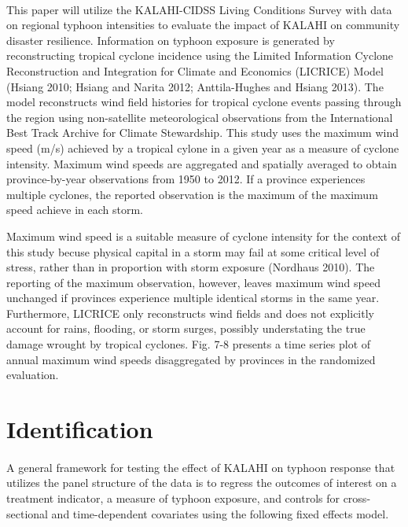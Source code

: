 \documentclass[12pt]{article}
\begin{document}
	\paragraph{ } This paper will utilize the KALAHI-CIDSS Living Conditions Survey with data on regional typhoon intensities to evaluate the impact of KALAHI on community disaster resilience. Information on typhoon exposure is generated by reconstructing tropical cyclone incidence using the Limited Information Cyclone Reconstruction and Integration for Climate and Economics (LICRICE) Model (Hsiang 2010; Hsiang and Narita 2012; Anttila-Hughes and Hsiang 2013). The model reconstructs wind field histories for tropical cyclone events passing through the region using non-satellite meteorological observations from the International Best Track Archive for Climate Stewardship. This study uses the maximum wind speed (m/s) achieved by a tropical cylone in a given year as a measure of cyclone intensity. Maximum wind speeds are aggregated and spatially averaged to obtain province-by-year observations from 1950 to 2012. If a province experiences multiple cyclones, the reported observation is the maximum of the maximum speed achieve in each storm. 

	Maximum wind speed is a suitable measure of cyclone intensity for the context of this study becuse physical capital in a storm may fail at some critical level of stress, rather than in proportion with storm exposure (Nordhaus 2010). The reporting of the maximum observation, however, leaves maximum wind speed unchanged if provinces experience multiple identical storms in the same year. Furthermore, LICRICE only reconstructs wind fields and does not explicitly account for rains, flooding, or storm surges, possibly understating the true damage wrought by tropical cyclones. Fig. 7-8 presents a time series plot of annual maximum wind speeds disaggregated by provinces in the randomized evaluation. 		

\section{Identification}

	\paragraph{ } A general framework for testing the effect of KALAHI on typhoon response that utilizes the panel structure of the data is to regress the outcomes of interest on a treatment indicator, a measure of typhoon exposure, and controls for cross-sectional and time-dependent covariates using the following fixed effects model.
\end{document}
